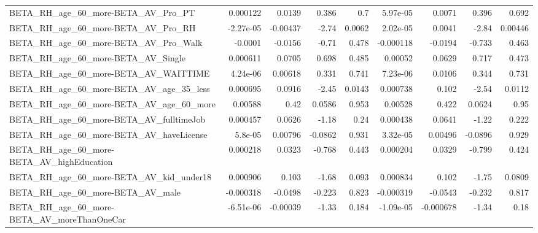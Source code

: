 \begin{tabular}{lrrrrrrrr}
BETA\_RH\_age\_60\_more-BETA\_AV\_Pro\_PT                 &    0.000122 &       0.0139 &    0.386 &      0.7 &   5.97e-05 &      0.0071 &        0.396 &         0.692 \\
BETA\_RH\_age\_60\_more-BETA\_AV\_Pro\_RH                 &   -2.27e-05 &     -0.00437 &    -2.74 &   0.0062 &   2.02e-05 &      0.0041 &        -2.84 &       0.00446 \\
BETA\_RH\_age\_60\_more-BETA\_AV\_Pro\_Walk               &     -0.0001 &      -0.0156 &    -0.71 &    0.478 &  -0.000118 &     -0.0194 &       -0.733 &         0.463 \\
BETA\_RH\_age\_60\_more-BETA\_AV\_Single                 &    0.000611 &       0.0705 &    0.698 &    0.485 &    0.00052 &      0.0629 &        0.717 &         0.473 \\
BETA\_RH\_age\_60\_more-BETA\_AV\_WAITTIME               &    4.24e-06 &      0.00618 &    0.331 &    0.741 &   7.23e-06 &      0.0106 &        0.344 &         0.731 \\
BETA\_RH\_age\_60\_more-BETA\_AV\_age\_35\_less            &    0.000695 &       0.0916 &    -2.45 &   0.0143 &   0.000738 &       0.102 &        -2.54 &        0.0112 \\
BETA\_RH\_age\_60\_more-BETA\_AV\_age\_60\_more            &     0.00588 &         0.42 &   0.0586 &    0.953 &    0.00528 &       0.422 &       0.0624 &          0.95 \\
BETA\_RH\_age\_60\_more-BETA\_AV\_fulltimeJob            &    0.000457 &       0.0626 &    -1.18 &     0.24 &   0.000438 &      0.0641 &        -1.22 &         0.222 \\
BETA\_RH\_age\_60\_more-BETA\_AV\_haveLicense            &     5.8e-05 &      0.00796 &  -0.0862 &    0.931 &   3.32e-05 &     0.00496 &      -0.0896 &         0.929 \\
BETA\_RH\_age\_60\_more-BETA\_AV\_highEducation          &    0.000218 &       0.0323 &   -0.768 &    0.443 &   0.000204 &      0.0329 &       -0.799 &         0.424 \\
BETA\_RH\_age\_60\_more-BETA\_AV\_kid\_under18            &    0.000906 &        0.103 &    -1.68 &    0.093 &   0.000834 &       0.102 &        -1.75 &        0.0809 \\
BETA\_RH\_age\_60\_more-BETA\_AV\_male                   &   -0.000318 &      -0.0498 &   -0.223 &    0.823 &  -0.000319 &     -0.0543 &       -0.232 &         0.817 \\
BETA\_RH\_age\_60\_more-BETA\_AV\_moreThanOneCar         &   -6.51e-06 &     -0.00039 &    -1.33 &    0.184 &  -1.09e-05 &   -0.000678 &        -1.34 &          0.18 \\

\end{tabular}
